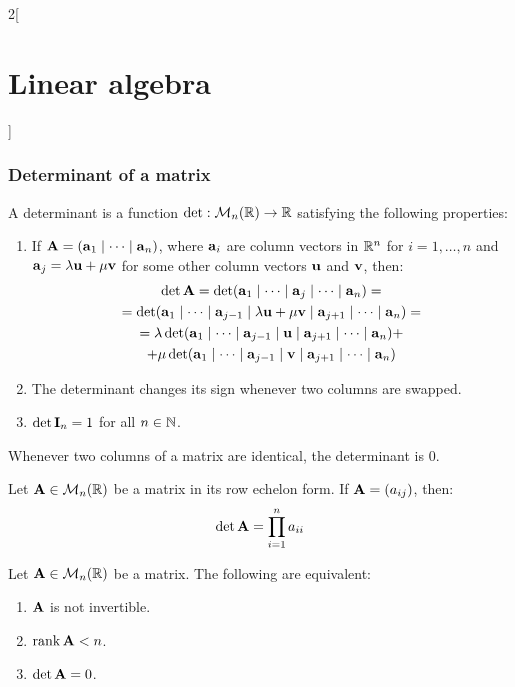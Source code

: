 \documentclass[../../../main_math.tex]{subfiles}
\begin{document}
\begin{multicols}{2}[\section{Linear algebra}]
  \subsubsection{Determinant of a matrix}
  \begin{definition}[Determinant]
    A determinant is a function $\det:\mathcal{M}_n(\mathbb{R})\rightarrow\mathbb{R}$ satisfying the following properties:
    \begin{enumerate}
      \item If $\boldsymbol{\mathrm{A}}=(\boldsymbol{\mathrm{a}}_1\mid\cdots\mid \boldsymbol{\mathrm{a}}_n)$, where $\boldsymbol{\mathrm{a}}_i$ are column vectors in $\mathbb{R}^n$ for $i=1,\ldots,n$ and $\boldsymbol{\mathrm{a}}_j=\lambda\boldsymbol{\mathrm{u}}+\mu\boldsymbol{\mathrm{v}}$ for some other column vectors $\boldsymbol{\mathrm{u}}$ and $\boldsymbol{\mathrm{v}}$, then:
            \begin{multline*}
              \det \boldsymbol{\mathrm{A}}=\det(\boldsymbol{\mathrm{a}}_1\mid\cdots\mid\boldsymbol{\mathrm{a}}_j\mid\cdots\mid \boldsymbol{\mathrm{a}}_n)=\\=\det(\boldsymbol{\mathrm{a}}_1\mid\cdots\mid \boldsymbol{\mathrm{a}}_{j-1}\mid\lambda \boldsymbol{\mathrm{u}}+\mu \boldsymbol{\mathrm{v}}\mid \boldsymbol{\mathrm{a}}_{j+1}\mid\cdots\mid \boldsymbol{\mathrm{a}}_n)=\\=\lambda\det(\boldsymbol{\mathrm{a}}_1\mid\cdots\mid \boldsymbol{\mathrm{a}}_{j-1}\mid \boldsymbol{\mathrm{u}}\mid \boldsymbol{\mathrm{a}}_{j+1}\mid\cdots\mid \boldsymbol{\mathrm{a}}_n)+\\+\mu\det(\boldsymbol{\mathrm{a}}_1\mid\cdots\mid \boldsymbol{\mathrm{a}}_{j-1}\mid \boldsymbol{\mathrm{v}}\mid \boldsymbol{\mathrm{a}}_{j+1}\mid\cdots\mid \boldsymbol{\mathrm{a}}_n)
            \end{multline*}
      \item The determinant changes its sign whenever two columns are swapped.
      \item $\det \boldsymbol{\mathrm{I}}_n=1$ for all $n\in\mathbb{N}$.
    \end{enumerate}
  \end{definition}
  \begin{lemma}
    Whenever two columns of a matrix are identical, the determinant is 0.
  \end{lemma}
  \begin{proposition}
    Let $\boldsymbol{\mathrm{A}}\in\mathcal{M}_n(\mathbb{R})$ be a matrix in its row echelon form. If $\boldsymbol{\mathrm{A}}=(a_{ij})$, then: $$\det\boldsymbol{\mathrm{A}}=\prod_{i=1}^na_{ii}$$
  \end{proposition}
  \begin{proposition}
    Let $\boldsymbol{\mathrm{A}}\in\mathcal{M}_n(\mathbb{R})$ be a matrix. The following are equivalent:
    \begin{enumerate}
      \item $\boldsymbol{\mathrm{A}}$ is not invertible.
      \item $\rank\boldsymbol{\mathrm{A}}<n$.
      \item $\det\boldsymbol{\mathrm{A}}=0$.
    \end{enumerate}

\end{proposition}
\end{multicols}
\end{document}
